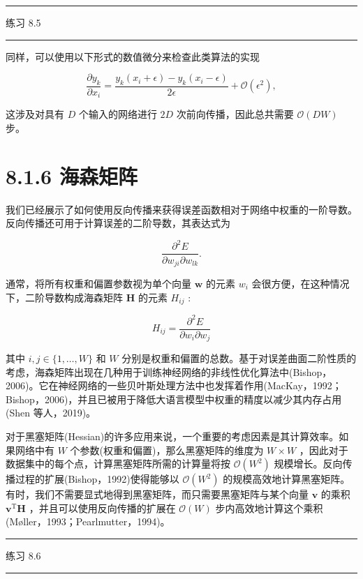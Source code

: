 \documentclass[10pt]{report}
\newcommand{\HRule}{\begin{center}\rule{0.9\linewidth}{0.2mm}\end{center}}
\begin{document}
\HRule

练习 8.5

\HRule

同样，可以使用以下形式的数值微分来检查此类算法的实现

\[
\frac{\partial {y}_{k}}{\partial {x}_{i}} = \frac{{y}_{k}\left( {{x}_{i} + \epsilon }\right)  - {y}_{k}\left( {{x}_{i} - \epsilon }\right) }{2\epsilon } + \mathcal{O}\left( {\epsilon }^{2}\right) , \tag{8.35}
\]

这涉及对具有 \(D\) 个输入的网络进行 \({2D}\) 次前向传播，因此总共需要 \(\mathcal{O}\left( {DW}\right)\) 步。

\section*{8.1.6 海森矩阵}

我们已经展示了如何使用反向传播来获得误差函数相对于网络中权重的一阶导数。反向传播还可用于计算误差的二阶导数，其表达式为

\[
\frac{{\partial }^{2}E}{\partial {w}_{ji}\partial {w}_{lk}}. \tag{8.36}
\]

通常，将所有权重和偏置参数视为单个向量 \(\mathbf{w}\) 的元素 \({w}_{i}\) 会很方便，在这种情况下，二阶导数构成海森矩阵 \(\mathbf{H}\) 的元素 \({H}_{ij}\) :

\[
{H}_{ij} = \frac{{\partial }^{2}E}{\partial {w}_{i}\partial {w}_{j}} \tag{8.37}
\]

其中 \(i,j \in  \{ 1,\ldots ,W\}\) 和 \(W\) 分别是权重和偏置的总数。基于对误差曲面二阶性质的考虑，海森矩阵出现在几种用于训练神经网络的非线性优化算法中(Bishop，2006)。它在神经网络的一些贝叶斯处理方法中也发挥着作用(MacKay，1992；Bishop，2006)，并且已被用于降低大语言模型中权重的精度以减少其内存占用(Shen 等人，2019)。

对于黑塞矩阵(Hessian)的许多应用来说，一个重要的考虑因素是其计算效率。如果网络中有 \(W\) 个参数(权重和偏置)，那么黑塞矩阵的维度为 \(W \times  W\) ，因此对于数据集中的每个点，计算黑塞矩阵所需的计算量将按 \(\mathcal{O}\left( {W}^{2}\right)\) 规模增长。反向传播过程的扩展(Bishop，1992)使得能够以 \(\mathcal{O}\left( {W}^{2}\right)\) 的规模高效地计算黑塞矩阵。有时，我们不需要显式地得到黑塞矩阵，而只需要黑塞矩阵与某个向量 \(\mathbf{v}\) 的乘积 \({\mathbf{v}}^{\mathrm{T}}\mathbf{H}\) ，并且可以使用反向传播的扩展在 \(\mathcal{O}\left( W\right)\) 步内高效地计算这个乘积(Møller，1993；Pearlmutter，1994)。

\HRule

练习 8.6

\HRule
\end{document}

